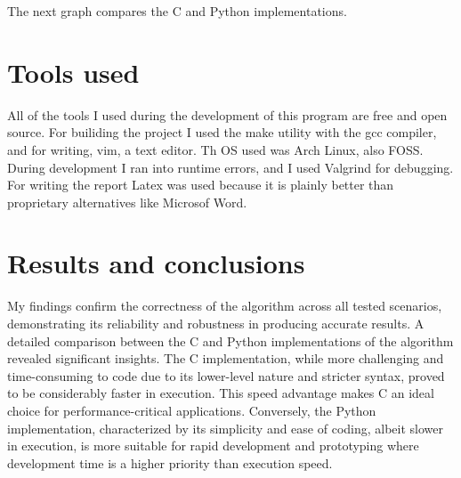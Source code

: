 \documentclass[a4paper,12pt]{article}
\begin{document}
The next graph compares the C and Python implementations.
\begin{figure}[h]
  \centering
\end{figure}
 
\newpage
\section{Tools used}

All of the tools I used during the development of this program are free and open source. For builiding the project I used the make utility with the gcc compiler, and for writing, vim, a text editor. Th OS used was Arch Linux, also FOSS. During development I ran into runtime errors, and I used Valgrind for debugging. For writing the report Latex was used because it is plainly better than proprietary alternatives like Microsof Word.


\section{Results and conclusions}

My findings confirm the correctness of the algorithm across all tested scenarios, demonstrating its reliability and robustness in producing accurate results.
A detailed comparison between the C and Python implementations of the algorithm revealed significant insights. The C implementation, while more challenging and time-consuming to code due to its lower-level nature and stricter syntax, proved to be considerably faster in execution. This speed advantage makes C an ideal choice for performance-critical applications. Conversely, the Python implementation, characterized by its simplicity and ease of coding, albeit slower in execution, is more suitable for rapid development and prototyping where development time is a higher priority than execution speed.
\end{document}

